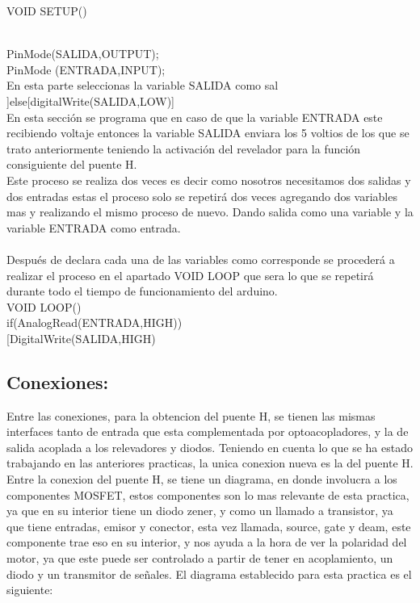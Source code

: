 \documentclass[12pt,a4paper]{article}
\begin{document}
VOID SETUP(){\\
PinMode(SALIDA,OUTPUT);\\
PinMode (ENTRADA,INPUT);\\

En esta parte seleccionas la variable SALIDA como sal
]else[digitalWrite(SALIDA,LOW)]\\

En esta sección se programa que en caso de que la variable ENTRADA este recibiendo voltaje entonces la variable  SALIDA enviara los 5 voltios de los que se trato anteriormente teniendo la activación del revelador para la función consiguiente del puente H.\\
Este proceso se realiza dos veces es decir como nosotros necesitamos dos salidas y dos entradas estas el proceso solo se repetirá dos veces agregando dos variables mas y realizando el mismo proceso de nuevo. Dando salida como una variable y la variable ENTRADA como entrada.\\\\

Después de declara cada una de las variables como corresponde se procederá a realizar el proceso en el apartado VOID LOOP que sera lo que se repetirá durante todo el tiempo de funcionamiento del arduino.\\
VOID LOOP()\\
if(AnalogRead(ENTRADA,HIGH))\\

[DigitalWrite(SALIDA,HIGH)\\

\subsection{Conexiones:}

Entre las conexiones, para la obtencion del puente H, se tienen las mismas interfaces tanto de entrada que esta complementada por optoacopladores, y la de salida acoplada a los relevadores y diodos. Teniendo en cuenta lo que se ha estado trabajando en las anteriores practicas, la unica conexion nueva es la del puente H.\\

Entre la conexion del puente H, se tiene un diagrama, en donde involucra a los componentes MOSFET, estos componentes son lo mas relevante de esta practica, ya que en su interior tiene un diodo zener, y como un llamado a transistor, ya que tiene entradas, emisor y conector, esta vez llamada, source, gate y deam, este componente trae eso en su interior, y nos ayuda a la hora de ver la polaridad del motor, ya que este puede ser controlado a partir de tener en acoplamiento, un diodo y un transmitor de señales. El diagrama establecido para esta practica es el siguiente:\\

}
\end{document}
